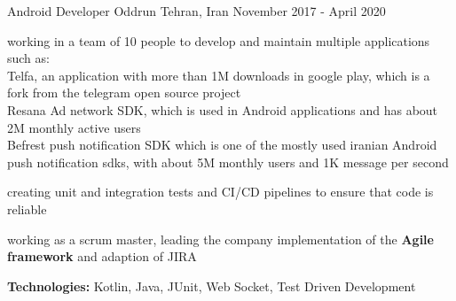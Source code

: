\begin{cventries}
    \cventry
    {Android Developer} %
    {Oddrun} %
    {Tehran, Iran} %
    {November 2017 - April 2020} %
    { 
      \begin{cvitems} %
        \item working in a team of 10 people to develop and maintain multiple applications such as: 
        \\ Telfa, an application with more than 1M downloads in google play, which is a fork from the telegram open source project
        \\ Resana Ad network SDK, which is used in Android applications and has about 2M monthly active users
        \\ Befrest push notification SDK which is one of the mostly used iranian Android push notification sdks, with about 5M monthly users and 1K message per second
        \item creating unit and integration tests and CI/CD pipelines to ensure that code is reliable
        \item working as a scrum master, leading the company implementation of the \textbf{Agile framework} and adaption of JIRA
        \item \textbf{Technologies:} Kotlin, Java, JUnit, Web Socket, Test Driven Development
      \end{cvitems}
    }

\end{cventries}
